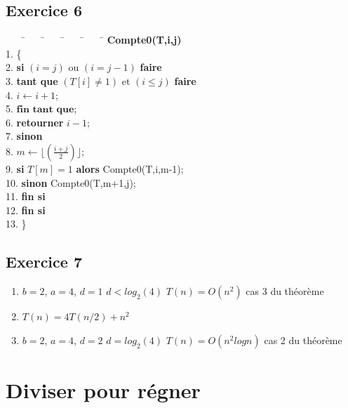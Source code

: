 \documentclass{article}[12pt]
\begin{document}
\newpage
\subsection*{Exercice 6}



\begin{tabbing}
~~~~\=~~~~\=~~~~\=~~~~\=~~~~\=\kill
\> \textbf{Compte0(T,i,j)}\\
1.\> \{\\
2.\> \textbf{si} $(i=j)$ ou $(i=j-1)$ \textbf{faire}\\
3.\> \> \textbf{tant que} $(T[i]\neq 1)$ et $(i\leq j)$ \textbf{faire}\\
4.\> \>\> $i\leftarrow i+1$;\\
5.\> \> $\textbf{fin tant que}$;\\
6.\> \> \textbf{retourner} $i-1$;\\
7.\> \textbf{sinon} \\
8.\> \> $m \leftarrow \lfloor (\frac{i+j}{2}) \rfloor$;\\
9. \> \> \textbf{si} $T[m]=1$ \textbf{alors} Compte0(T,i,m-1);\\
10. \> \> \textbf{sinon} Compte0(T,m+1,j);\\
11. \> \> \textbf{fin si}\\
12. \> \textbf{fin si}\\
13.\> \}
\end{tabbing}

\subsection*{Exercice 7}
\begin{enumerate}
    \item $b=2$, $a=4$, $d=1$ $d<log_2(4)$ $T(n)=O(n^2)$ cas 3 du théorème
    \item $T(n)=4T(n/2)+n^2$
    \item $b=2$, $a=4$, $d=2$ $d=log_2(4)$ $T(n)=O(n^2logn)$ cas 2 du théorème
\end{enumerate}


\section{Diviser pour régner}
\end{document}
